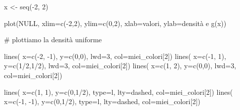 \documentclass[
  italian,
  letterpaper,
]{book}
\newenvironment{Shaded}{\begin{snugshade}}{\end{snugshade}}
\newcommand{\AttributeTok}[1]{\textcolor[rgb]{0.40,0.45,0.13}{#1}}
\newcommand{\CommentTok}[1]{\textcolor[rgb]{0.37,0.37,0.37}{#1}}
\newcommand{\ConstantTok}[1]{\textcolor[rgb]{0.56,0.35,0.01}{#1}}
\newcommand{\DecValTok}[1]{\textcolor[rgb]{0.68,0.00,0.00}{#1}}
\newcommand{\FunctionTok}[1]{\textcolor[rgb]{0.28,0.35,0.67}{#1}}
\newcommand{\NormalTok}[1]{\textcolor[rgb]{0.00,0.23,0.31}{#1}}
\newcommand{\OtherTok}[1]{\textcolor[rgb]{0.00,0.23,0.31}{#1}}
\newcommand{\SpecialCharTok}[1]{\textcolor[rgb]{0.37,0.37,0.37}{#1}}
\newcommand{\StringTok}[1]{\textcolor[rgb]{0.13,0.47,0.30}{#1}}
\theoremstyle{definition}
\theoremstyle{remark}
\begin{document}
\begin{Shaded}
\begin{Highlighting}[]
\NormalTok{x }\OtherTok{\textless{}{-}} \FunctionTok{seq}\NormalTok{(}\SpecialCharTok{{-}}\DecValTok{2}\NormalTok{, }\DecValTok{2}\NormalTok{)}

\FunctionTok{plot}\NormalTok{(}\ConstantTok{NULL}\NormalTok{, }\AttributeTok{xlim=}\FunctionTok{c}\NormalTok{(}\SpecialCharTok{{-}}\DecValTok{2}\NormalTok{,}\DecValTok{2}\NormalTok{), }\AttributeTok{ylim=}\FunctionTok{c}\NormalTok{(}\DecValTok{0}\NormalTok{,}\DecValTok{2}\NormalTok{), }\AttributeTok{xlab=}\StringTok{\textquotesingle{}valori\textquotesingle{}}\NormalTok{, }\AttributeTok{ylab=}\StringTok{\textquotesingle{}densità e g(x)\textquotesingle{}}\NormalTok{)}

\CommentTok{\# plottiamo la densità uniforme}

\FunctionTok{lines}\NormalTok{( }\AttributeTok{x=}\FunctionTok{c}\NormalTok{(}\SpecialCharTok{{-}}\DecValTok{2}\NormalTok{, }\SpecialCharTok{{-}}\DecValTok{1}\NormalTok{), }\AttributeTok{y=}\FunctionTok{c}\NormalTok{(}\DecValTok{0}\NormalTok{,}\DecValTok{0}\NormalTok{), }\AttributeTok{lwd=}\DecValTok{3}\NormalTok{, }\AttributeTok{col=}\NormalTok{miei\_colori[}\DecValTok{2}\NormalTok{])}
\FunctionTok{lines}\NormalTok{( }\AttributeTok{x=}\FunctionTok{c}\NormalTok{(}\SpecialCharTok{{-}}\DecValTok{1}\NormalTok{, }\DecValTok{1}\NormalTok{), }\AttributeTok{y=}\FunctionTok{c}\NormalTok{(}\DecValTok{1}\SpecialCharTok{/}\DecValTok{2}\NormalTok{,}\DecValTok{1}\SpecialCharTok{/}\DecValTok{2}\NormalTok{), }\AttributeTok{lwd=}\DecValTok{3}\NormalTok{, }\AttributeTok{col=}\NormalTok{miei\_colori[}\DecValTok{2}\NormalTok{])}
\FunctionTok{lines}\NormalTok{( }\AttributeTok{x=}\FunctionTok{c}\NormalTok{(}\DecValTok{1}\NormalTok{, }\DecValTok{2}\NormalTok{), }\AttributeTok{y=}\FunctionTok{c}\NormalTok{(}\DecValTok{0}\NormalTok{,}\DecValTok{0}\NormalTok{), }\AttributeTok{lwd=}\DecValTok{3}\NormalTok{, }\AttributeTok{col=}\NormalTok{miei\_colori[}\DecValTok{2}\NormalTok{])}

\FunctionTok{lines}\NormalTok{( }\AttributeTok{x=}\FunctionTok{c}\NormalTok{(}\DecValTok{1}\NormalTok{, }\DecValTok{1}\NormalTok{), }\AttributeTok{y=}\FunctionTok{c}\NormalTok{(}\DecValTok{0}\NormalTok{,}\DecValTok{1}\SpecialCharTok{/}\DecValTok{2}\NormalTok{), }\AttributeTok{type=}\StringTok{\textquotesingle{}l\textquotesingle{}}\NormalTok{, }\AttributeTok{lty=}\StringTok{\textquotesingle{}dashed\textquotesingle{}}\NormalTok{, }\AttributeTok{col=}\NormalTok{miei\_colori[}\DecValTok{2}\NormalTok{])}
\FunctionTok{lines}\NormalTok{( }\AttributeTok{x=}\FunctionTok{c}\NormalTok{(}\SpecialCharTok{{-}}\DecValTok{1}\NormalTok{, }\SpecialCharTok{{-}}\DecValTok{1}\NormalTok{), }\AttributeTok{y=}\FunctionTok{c}\NormalTok{(}\DecValTok{0}\NormalTok{,}\DecValTok{1}\SpecialCharTok{/}\DecValTok{2}\NormalTok{), }\AttributeTok{type=}\StringTok{\textquotesingle{}l\textquotesingle{}}\NormalTok{, }\AttributeTok{lty=}\StringTok{\textquotesingle{}dashed\textquotesingle{}}\NormalTok{, }\AttributeTok{col=}\NormalTok{miei\_colori[}\DecValTok{2}\NormalTok{])}



\end{Highlighting}
\end{Shaded}
\end{document}
